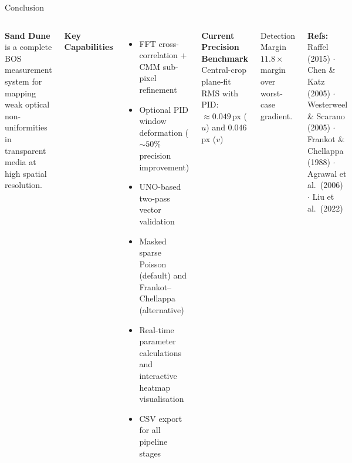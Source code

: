\documentclass[9pt, aspectratio=169]{beamer}
\begin{document}
\begin{frame}{Conclusion}{}
  \begin{columns}[t]
    \begin{minipage}{\columnwidth}
      \vspace{0.5cm}
      \textbf{Sand Dune} is a complete BOS measurement system for mapping weak optical non-uniformities in transparent media at high spatial resolution.
    \end{minipage}

      \vspace{0.35em}
      \textbf{Key Capabilities}
      \begin{itemize}
        \item FFT cross-correlation + CMM sub-pixel refinement
        \item Optional PID window deformation ($\sim50\%$ precision improvement)
        \item UNO-based two-pass vector validation
        \item Masked sparse Poisson (default) and Frankot--Chellappa (alternative)
        \item Real-time parameter calculations and interactive heatmap visualisation
        \item CSV export for all pipeline stages
      \end{itemize}
      \vspace{0.3em}
      \textbf{Current Precision Benchmark}\\
      Central-crop plane-fit RMS with PID:\\
      $\approx0.049$\,px ($u$) and $0.046$\,px ($v$)
      \vspace{1cm}
      \begin{block}{Detection Margin}
        \centering\large
        $\mathbf{11.8\times}$ margin over worst-case gradient.
      \end{block}
      \vspace{0.35em}
      \footnotesize \textbf{Refs:} Raffel (2015) $\cdot$ Chen \& Katz (2005) $\cdot$ Westerweel \& Scarano (2005) $\cdot$ Frankot \& Chellappa (1988) $\cdot$ Agrawal et al.\ (2006) $\cdot$ Liu et al.\ (2022)
  \end{columns}
\end{frame}
\end{document}
